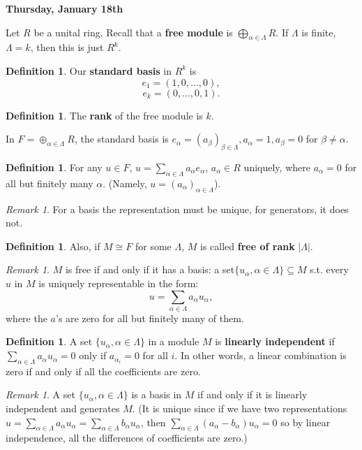 \documentclass[9pt,reqno,twoside]{amsbook}
\theoremstyle{plain}
\numberwithin{section}{chapter}
\numberwithin{equation}{chapter}
\theoremstyle{definition}
\newtheorem{Def}[theorem]{Definition}
\theoremstyle{remark}
\newtheorem{rem}[theorem]{Remark}
\theoremstyle{plain}
\newcommand{\sub}{\subseteq}
\begin{document}
\vspace{5mm}
\textbf{Thursday, January 18th}

\vspace{5mm}
Let $R$ be a unital ring. Recall that a \textbf{free module} is $\bigoplus_{\alpha \in \Lambda} R$. If $\Lambda$ is finite, $\Lambda = k$, then this is just $R^k$. 
\begin{Def}
Our \textbf{standard basis} in $R^k$ is 
$$
e_1 = (1,0,...,0),
$$
$$
e_k = (0,...,0,1). 
$$
\end{Def}
\begin{Def}
The \textbf{rank} of the free module is $k$. 
\end{Def}

In $F = \oplus_{\alpha \in \Lambda} R$, the standard basis is $e_\alpha = (a_\beta)_{\beta \in \Lambda},a_\alpha = 1,a_\beta = 0$ for $\beta \neq \alpha$. 
\begin{Def}
For any $u \in F$, $u= \sum_{\alpha \in \Lambda}a_\alpha e_\alpha$, $a_\alpha \in R$ uniquely, where $a_\alpha =0$ for all but finitely many $\alpha$. (Namely, $u = (a_\alpha)_{\alpha \in \Lambda}$). 
\end{Def}

\begin{rem}
For a basis the representation must be unique, for generators, it does not. 
\end{rem}
\begin{Def}
Also, if $M \cong F$ for some $\Lambda$, $M$ is called \textbf{free of rank} $|\Lambda|$. 
\end{Def}
\begin{rem}
$M$ is free if and only if it has a basis: a set$\{u_\alpha, \alpha \in \Lambda\} \sub M$ s.t. every $u$ in $M$ is uniquely representable in the form:
$$
u= \sum_{\alpha \in \Lambda}a_\alpha u_\alpha,
$$
where the $a$'s are zero for all but finitely many of them. 
\end{rem}

\begin{Def}
A set $\{u_\alpha, \alpha \in \Lambda\}$ in a module $M$ is \textbf{linearly independent} if $\sum_{\alpha \in \Lambda}a_\alpha u_\alpha = 0$ only if $a_{\alpha_i} = 0$ for all $i$. In other words, a linear combination is zero if and only if all the coefficients are zero. 
\end{Def}

\begin{rem} \label{rem1076}
A set $\{u_\alpha, \alpha \in \Lambda\}$ is a basis in $M$ if and only if it is linearly independent and generates $M$. (It is unique since if we have two representations $u = \sum_{\alpha \in \Lambda}a_\alpha u_\alpha = \sum_{\alpha \in \Lambda}b_\alpha u_\alpha$, then $\sum_{\alpha \in \Lambda}(a_\alpha - b_\alpha) u_\alpha = 0$ so by linear independence, all the differences of coefficients are zero.)
\end{rem}
\end{document}
